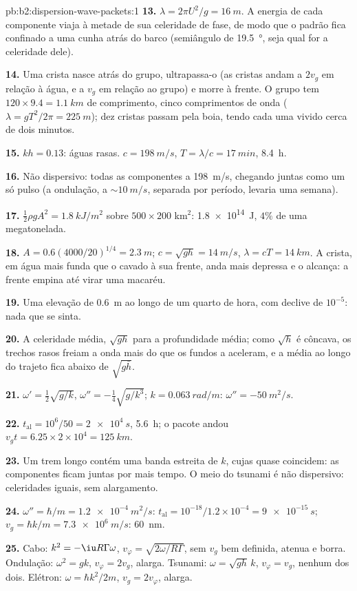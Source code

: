 \begin{solution}{pb:b2:dispersion-wave-packets:1}
\textbf{13.} $\lambda = 2\pi U^2/g = \qty{16}{m}$. A energia de cada componente
viaja à metade de sua celeridade de fase, de modo que o padrão fica confinado a uma cunha
atrás do barco (semiângulo de \qty{19.5}{\degree}, seja qual for a celeridade dele).

\textbf{14.} Uma crista nasce atrás do grupo, ultrapassa-o
(as cristas andam a $2v_g$ em relação à água, e a $v_g$ em relação ao
grupo) e morre à frente. O grupo tem $120 \times 9.4 = \qty{1.1}{km}$
de comprimento, cinco comprimentos de onda ($\lambda = gT^2/2\pi = \qty{225}{m}$); dez cristas passam pela
boia, tendo cada uma vivido cerca de dois minutos.

\textbf{15.} $kh = 0.13$: águas rasas. $c = \qty{198}{m/s}$, $T = \lambda/c = \qty{17}{min}$,
\qty{8.4}{h}.

\textbf{16.} Não dispersivo: todas as componentes a \qty{198}{m/s}, chegando
juntas como um só pulso (a ondulação, a $\sim\qty{10}{m/s}$, separada por período,
levaria uma semana).

\textbf{17.} $\tfrac12\rho gA^2 = \qty{1.8}{kJ/m^2}$ sobre $500 \times 200$ km$^2$: \qty{1.8e14}{J},
$4\%$ de uma megatonelada.

\textbf{18.} $A = 0.6(4000/20)^{1/4} = \qty{2.3}{m}$; $c = \sqrt{gh} = \qty{14}{m/s}$, $\lambda =
cT = \qty{14}{km}$. A crista, em água mais funda que o cavado à sua frente,
anda mais depressa e o alcança: a frente empina até virar uma macaréu.

\textbf{19.} Uma elevação de \qty{0.6}{m} ao longo de um quarto de hora, com declive
de $10^{-5}$: nada que se sinta.

\textbf{20.} A celeridade média, $\sqrt{gh}$ para a profundidade média; como
$\sqrt h$ é côncava, os trechos rasos freiam a onda mais do que os fundos
a aceleram, e a média ao longo do trajeto fica abaixo de $\sqrt{g\bar h}$.

\textbf{21.} $\omega' = \tfrac12\sqrt{g/k}$, $\omega'' = -\tfrac14\sqrt{g/k^3}$; $k = \qty{0.063}{rad/m}$:
$\omega'' = \qty{-50}{m^2/s}$.

\textbf{22.} $t_{\text{al}} = 10^6/50 = \qty{2e4}{s}$, \qty{5.6}{h}; o pacote
andou $v_gt = 6.25 \times 2 \times 10^4 = \qty{125}{km}$.

\textbf{23.} Um trem longo contém uma banda estreita de $k$, cujas  quase coincidem: as componentes ficam juntas por mais tempo. O
meio do tsunami é não dispersivo: celeridades iguais, sem alargamento.

\textbf{24.} $\omega'' = \hbar/m = \qty{1.2e-4}{m^2/s}$: $t_{\text{al}} = 10^{-18}/1.2 \times
10^{-4} = \qty{9e-15}{s}$; $v_g = \hbar k/m = \qty{7.3e6}{m/s}$: \qty{60}{nm}.

\textbf{25.} Cabo: $k^2 = -\iu R\Gamma\omega$, $v_\varphi = \sqrt{2\omega/R\Gamma}$, sem
$v_g$ bem definida, atenua e borra. Ondulação: $\omega^2 = gk$, $v_\varphi = 2v_g$,
alarga. Tsunami: $\omega = \sqrt{gh}\,k$, $v_\varphi = v_g$, nenhum dos dois. Elétron:
$\omega = \hbar k^2/2m$, $v_g = 2v_\varphi$, alarga.
\end{solution}
